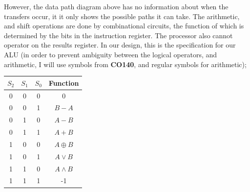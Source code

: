 \documentclass[a4paper, 12pt]{article}
\begin{document}
            However, the data path diagram above has no information about when the transfers occur, it it only shows the possible paths it can take. The arithmetic, and shift operations are done by combinational circuits, the function of which is determined by the bits in the instruction register. The processor also cannot operator on the results register. In our design, this is the specification for our ALU (in order to prevent ambiguity between the logical operators, and arithmetic, I will use symbols from \textbf{CO140}, and regular symbols for arithmetic);
            \begin{center}
                \begin{tabular}{c|c|c||c}
                    $S_2$ & $S_1$ & $S_0$ & Function \\
                    \hline
                    0 & 0 & 0 & 0 \\
                    0 & 0 & 1 & $B - A$ \\
                    0 & 1 & 0 & $A - B$ \\
                    0 & 1 & 1 & $A + B$ \\
                    1 & 0 & 0 & $A \oplus B$ \\
                    1 & 0 & 1 & $A \lor B$ \\
                    1 & 1 & 0 & $A \land B$ \\
                    1 & 1 & 1 & -1
                \end{tabular}
            \end{center}
\end{document}
